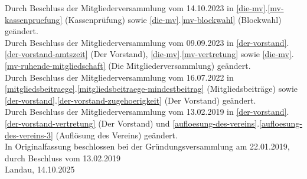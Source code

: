 \documentclass[a4paper, 12pt]{scrartcl}
\begin{document}
\noindent Durch Beschluss der Mitgliederversammlung vom 14.10.2023 in \ref{die-mv}.\ref{mv-kassenpruefung} (Kassenprüfung) sowie \ref{die-mv}.\ref{mv-blockwahl} (Blockwahl) geändert.\\
\noindent Durch Beschluss der Mitgliederversammlung vom 09.09.2023 in \ref{der-vorstand}.\ref{der-vorstand-amtszeit} (Der Vorstand), \ref{die-mv}.\ref{mv-vertretung} sowie \ref{die-mv}.\ref{mv-ruhende-mitgliedschaft}  (Die Mitgliederversammlung) geändert.\\
\noindent Durch Beschluss der Mitgliederversammlung vom 16.07.2022 in \ref{mitgliedsbeitraege}.\ref{mitgliedsbeitraege-mindestbeitrag} (Mitgliedsbeiträge) sowie \ref{der-vorstand}.\ref{der-vorstand-zugehoerigkeit} (Der Vorstand) geändert.\\
\noindent Durch Beschluss der Mitgliederversammlung vom 13.02.2019 in \ref{der-vorstand}.\ref{der-vorstand-vertretung} (Der Vorstand) und \ref{aufloesung-des-vereins}.\ref{aufloesung-des-vereins-3} (Auflösung des Vereins) geändert.\\
\noindent In Originalfassung beschlossen bei der Gründungsversammlung am 22.01.2019, durch Beschluss vom 13.02.2019\\
[0.5cm]

\noindent Landau, 14.10.2025
\end{document}
